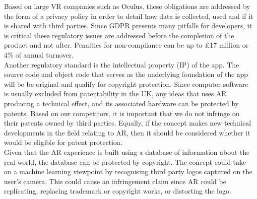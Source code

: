 Based on large VR companies such as Oculus, these obligations are addressed by the form of a privacy policy in order to detail how data is collected, used and if it is shared with third parties. Since GDPR presents many pitfalls for developers, it is critical these regulatory issues are addressed before the completion of the product and not after. Penalties for non-compliance can be up to \pounds 17 million or 4\% of annual turnover. \cite{eversheds}\\

Another regulatory standard is the intellectual property (IP) of the app. The source code and object code that serves as the underlying foundation of the app will be be original and qualify for copyright protection. Since computer software is usually excluded from patentability in the UK, any ideas that uses AR producing a technical effect, and its associated hardware can be protected by patents. Based on our competitors, it is important that we do not infringe on their patents owned by third parties. Equally, if the concept makes new technical developments in the field relating to AR, then it should be considered whether it would be eligible for patent protection.\\

Given that the AR experience is built using a database of information about the real world, the database can be protected by copyright. The concept could take on a machine learning viewpoint by recognising third party logos captured on the user's camera. This could cause an infringement claim since AR could be replicating, replacing trademark or copyright works, or distorting the logo.\\